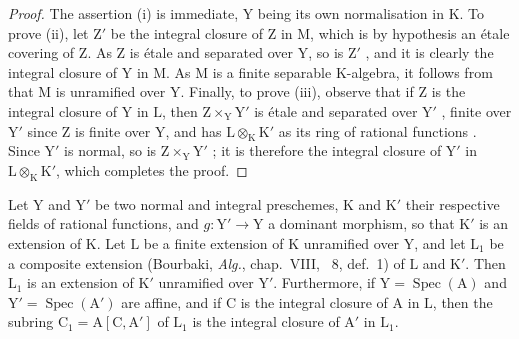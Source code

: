 \begin{proof}
The assertion (i) is immediate, $\mathrm{Y}$ being its own normalisation in $\mathrm{K}$.
To prove (ii), let $\mathrm{Z}'$ be the integral closure of $\mathrm{Z}$ in $\mathrm{M}$, which is by hypothesis an \'etale covering of $\mathrm{Z}$.
As $\mathrm{Z}$ is \'etale and separated over $\mathrm{Y}$, so is $\mathrm{Z}'$ , and it is clearly the integral closure of $\mathrm{Y}$ in $\mathrm{M}$.
As $\mathrm{M}$ is a finite separable $\mathrm{K}$-algebra, it follows from  that $\mathrm{M}$ is unramified over $\mathrm{Y}$.
Finally, to prove (iii), observe that if $\mathrm{Z}$ is the integral closure of $\mathrm{Y}$ in $\mathrm{L}$, then $\mathrm{Z}\times_{\mathrm{Y}}\mathrm{Y}'$ is \'etale and separated over $\mathrm{Y}'$ , finite over $\mathrm{Y}'$ since $\mathrm{Z}$ is finite over $\mathrm{Y}$, and has $\mathrm{L}\otimes_{\mathrm{K}}\mathrm{K}'$ as its ring of rational functions . Since $\mathrm{Y}'$ is normal, so is $\mathrm{Z}\times_{\mathrm{Y}}\mathrm{Y}'$ ; it is therefore the integral closure of $\mathrm{Y}'$ in $\mathrm{L}\otimes_{\mathrm{K}}\mathrm{K}'$, which completes the proof.
\end{proof}

\begin{corollary}[18.10.14]
\label{IV.18.10.14}
Let $\mathrm{Y}$ and $\mathrm{Y}'$ be two normal and integral preschemes, $\mathrm{K}$ and $\mathrm{K}'$ their respective fields of rational functions, and $g:\mathrm{Y}'\to\mathrm{Y}$ a dominant morphism, so that $\mathrm{K}'$ is an extension of $\mathrm{K}$.
Let $\mathrm{L}$ be a finite extension of $\mathrm{K}$ unramified over $\mathrm{Y}$, and let $\mathrm{L}_1$ be a composite extension (Bourbaki, \emph{Alg.}, chap.~VIII, \textsection~8, def.~1) of $\mathrm{L}$ and $\mathrm{K}'$.
Then $\mathrm{L}_1$ is an extension of $\mathrm{K}'$ unramified over $\mathrm{Y}'$.
Furthermore, if $\mathrm{Y}=\operatorname{Spec}(\mathrm{A})$ and $\mathrm{Y}'=\operatorname{Spec}(\mathrm{A}')$ are affine, and if $\mathrm{C}$ is the integral closure of $\mathrm{A}$ in $\mathrm{L}$, then the subring $\mathrm{C}_1=\mathrm{A}[\mathrm{C},\mathrm{A}']$ of $\mathrm{L}_1$ is the integral closure of $\mathrm{A}'$ in $\mathrm{L}_1$.
\end{corollary}


